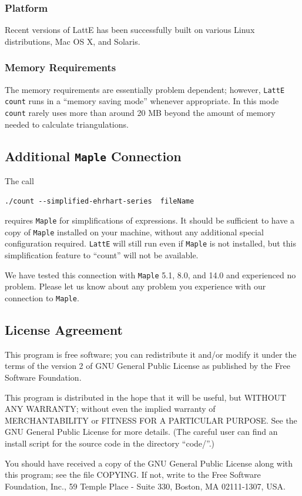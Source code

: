 \documentclass{article}
\newcommand{\latte}{{\tt LattE}\xspace}
\newcommand{\maple}{{\tt Maple}\xspace}
\begin{document}
\subsubsection{Platform} 
Recent versions of LattE has been successfully built on various Linux
distributions, Mac OS X, and Solaris.


\subsubsection{Memory Requirements} 
The memory requirements are essentially problem dependent; however,
{\tt LattE count} runs in a ``memory saving mode'' whenever appropriate.
In this mode {\tt count} rarely uses more than around 20 MB beyond the
amount of memory needed to calculate triangulations. 

\subsection{Additional \maple Connection}
The call
\begin{verbatim}
./count --simplified-ehrhart-series  fileName
\end{verbatim}
requires \maple for simplifications of expressions. It should be
sufficient to have a copy of \maple installed on your machine,
without any additional special configuration required.  \latte
will still run even if \maple is not installed, but this
simplification feature to ``count'' will not be available. 

We have tested this connection with \maple 5.1, 8.0, and 14.0 and experienced
no problem. Please let us know about any problem you experience with
our connection to \maple.

\subsection{License Agreement}

This program is free software; you can redistribute it and/or
modify it under the terms of the version 2 of GNU General Public
License as published by the Free Software Foundation.

This program is distributed in the hope that it will be useful,
but WITHOUT ANY WARRANTY; without even the implied warranty of
MERCHANTABILITY or FITNESS FOR A PARTICULAR PURPOSE. See the GNU
General Public License for more details. (The careful user can find
an install script for the source code in the directory ``code/''.)

You should have received a copy of the GNU General Public License
along with this program; see the file COPYING. If not, write to
the Free Software Foundation, Inc., 59 Temple Place - Suite 330,
Boston, MA 02111-1307, USA.
\end{document}

